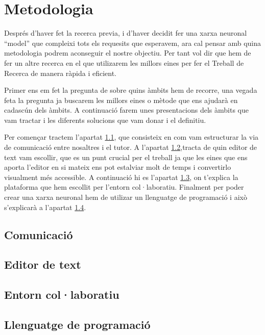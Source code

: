 \chapter{Metodologia}
Després d'haver fet la recerca previa, i d'haver decidit fer una xarxa neuronal ``model'' que compleixi tots els requesits que esperavem, ara cal pensar amb quina metodologia podrem aconseguir el nostre objectiu. Per tant vol dir que hem de fer un altre recerca en el que utilizarem les millors eines per fer el Treball de Recerca de manera ràpida i eficient.


Primer ens em fet la pregunta de  sobre quins àmbits hem de recorre, una vegada feta la pregunta ja buscarem les millors eines o mètode que ens ajudarà en cadascún dels àmbits. A continuació farem unes presentacions dels àmbits que vam tractar i les diferents solucions que vam donar i el definitiu.

Per començar tractem  l'apartat \ref{4.1}, que consisteix en com vam estructurar la via de comunicació entre nosaltres i el tutor. A l'apartat \ref{4.2},tracta de quin editor de text vam escollir, que es un punt crucial per el treball ja que les eines que ens aporta l'editor en si mateix ens pot estalviar molt de temps i convertirlo visualment més accessible. A continuació hi es l'apartat \ref{4.3}, on t'explica la plataforma que hem escollit per l'entorn col·laboratiu. Finalment per poder crear una xarxa neuronal hem de utilizar un llenguatge de programació i això s'explicarà a l'apartat \ref{4.4}.



\section{Comunicació}\label{4.1}
\section{Editor de text}\label{4.2}
\section{Entorn col·laboratiu}\label{4.3}
\section{Llenguatge de programació}\label{4.4}
